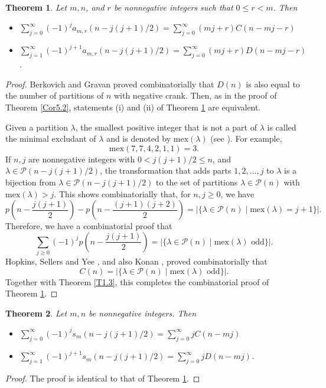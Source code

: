 \documentclass{amsart}
\def\mex{\textrm{mex}}
\newtheorem{theorem}{Theorem}[section]
\theoremstyle{definition}
\begin{document}
\begin{theorem}{\cite[Corollary 7.2]{M23}} \label{Cor7.2} Let $m,n$, and $r$ be nonnegative integers such that $0\leq r<m$. Then 
\begin{itemize}\item[(i)] $\displaystyle \sum_{j=0}^\infty (-1)^{j} a_{m,r}(n-j(j+1)/2)= \sum_{j=0}^\infty (mj+r)C(n-mj-r)$
\item[(ii)] $\displaystyle \sum_{j=1}^\infty (-1)^{j+1} a_{m,r}(n-j(j+1)/2)= \sum_{j=0}^\infty (mj+r)D(n-mj-r)$.
\end{itemize}
\end{theorem}
\begin{proof} Berkovich and Gravan \cite{BG} proved combinatorially that $D(n)$ is also equal to the number of partitions of $n$ with negative crank. Then, as in the proof of Theorem \ref{Cor5.2},   statements (i) and (ii) of  Theorem \ref{Cor7.2} are equivalent. 

Given a partition $\lambda$, the smallest positive integer that is not a part of $\lambda$ is called the minimal excludant of $\lambda$  and is denoted by $\mex(\lambda)$ (see \cite{GK,AN}). For example, $$\mex(7,7,4,2,1,1)=3.$$
If $n, j$ are nonnegative integers with $0<j(j+1)/2\leq n$, and $\lambda \in \mathcal P(n-j(j+1)/2)$, the transformation that adds parts $1, 2, \ldots, j$ to $\lambda$ is a bijection from $\lambda \in \mathcal P(n-j(j+1)/2)$ to the set of partitions $\lambda \in \mathcal P(n)$ with $\mex(\lambda)>j$. This shows combinatorially that, for $n, j\geq 0$, we have  $$p\left(n-\frac{j(j+1)}{2}\right)-p\left(n-\frac{(j+1)(j+2)}{2}\right)=|\{\lambda \in \mathcal P(n) \mid \mex(\lambda)=j+1\}|.$$ Therefore, we have a combinatorial proof that $$\sum_{j\geq 0} (-1)^jp\left(n-\frac{j(j+1)}{2}\right)=|\{\lambda \in \mathcal P(n) \mid \mex(\lambda) \text{ odd}\}|.$$
Hopkins, Sellers and Yee \cite{HSY}, and also Konan \cite{K}, proved combinatorially that $$C(n)=|\{\lambda \in \mathcal P(n) \mid \mex(\lambda) \text{ odd}\}|.$$ Together with Theorem \ref{T1.3}, this completes the combinatorial proof of Theorem \ref{Cor7.2}.
\end{proof}
\begin{theorem}{\cite[Corollary 7.3]{M23}} \label{Cor7.3} Let $m,n$  be nonnegative integers. Then 
\begin{itemize}\item[(i)] $\displaystyle \sum_{j=0}^\infty (-1)^{j} s_{m}(n-j(j+1)/2)= \sum_{j=0}^\infty jC(n-mj)$
\item[(ii)] $\displaystyle \sum_{j=1}^\infty (-1)^{j+1} s_{m}(n-j(j+1)/2)= \sum_{j=0}^\infty jD(n-mj)$.
\end{itemize}
\end{theorem}
\begin{proof}The proof is identical to that of Theorem \ref{Cor7.2}.
\end{proof}
\end{document}
